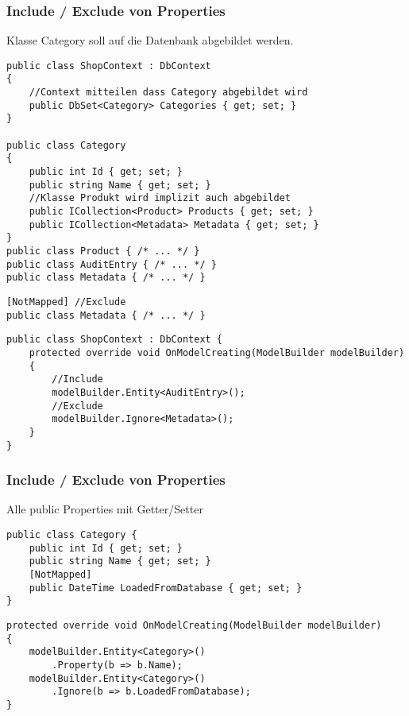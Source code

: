 \begin{multicols*}{2}
\subsubsection{Include / Exclude von Properties}
Klasse Category soll auf die Datenbank abgebildet werden.
\begin{lstlisting}
public class ShopContext : DbContext 
{
    //Context mitteilen dass Category abgebildet wird
    public DbSet<Category> Categories { get; set; }  
}

public class Category
{
    public int Id { get; set; }
    public string Name { get; set; }
    //Klasse Produkt wird implizit auch abgebildet
    public ICollection<Product> Products { get; set; } 
    public ICollection<Metadata> Metadata { get; set; }
}
public class Product { /* ... */ } 
public class AuditEntry { /* ... */ }
public class Metadata { /* ... */ }
\end{lstlisting}
\begin{lstlisting}
[NotMapped] //Exclude
public class Metadata { /* ... */ }  
\end{lstlisting}
\begin{lstlisting}
public class ShopContext : DbContext {
    protected override void OnModelCreating(ModelBuilder modelBuilder)
    {
        //Include
        modelBuilder.Entity<AuditEntry>(); 
        //Exclude
        modelBuilder.Ignore<Metadata>();
    } 
}
\end{lstlisting}

\subsubsection{Include / Exclude von Properties}
Alle public Properties mit Getter/Setter
\begin{lstlisting}
public class Category {
    public int Id { get; set; }
    public string Name { get; set; }
    [NotMapped]
    public DateTime LoadedFromDatabase { get; set; }
}
\end{lstlisting}
\begin{lstlisting}
protected override void OnModelCreating(ModelBuilder modelBuilder)
{
    modelBuilder.Entity<Category>()
        .Property(b => b.Name);
    modelBuilder.Entity<Category>()
        .Ignore(b => b.LoadedFromDatabase);
}
\end{lstlisting}

\end{multicols*}
